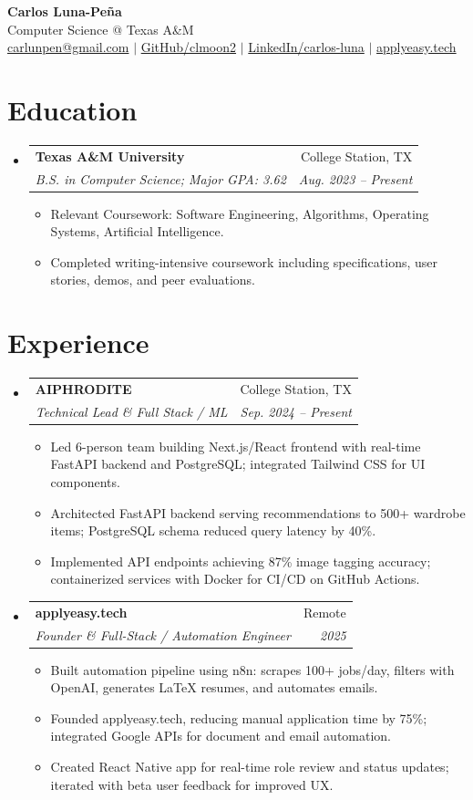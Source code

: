 \documentclass[letterpaper,11pt]{article}
\makeatletter
\newcommand{\resumeItem}[1]{%
  \item\small{{#1 \vspace{-2pt}}}
}
\newcommand{\resumeSubheading}[4]{%
  \vspace{-2pt}\item
    \begin{tabular*}{0.97\textwidth}[t]{l@{\extracolsep{\fill}}r}
      \textbf{#1} & #2 \\
      \textit{\small#3} & \textit{\small #4} \\
    \end{tabular*}\vspace{-7pt}
}
\newcommand{\resumeSubHeadingListStart}{\begin{itemize}[leftmargin=0.15in, label={}]}
\newcommand{\resumeSubHeadingListEnd}{\end{itemize}}
\newcommand{\resumeItemListStart}{\begin{itemize}}
\newcommand{\resumeItemListEnd}{\end{itemize}\vspace{-5pt}}
\makeatother
\begin{document}
\begin{center}
    \textbf{\LARGE Carlos Luna-Peña} \\ \vspace{2pt}
    \small Computer Science @ Texas A\&M \\ \vspace{1pt}
    \small \href{mailto:carlunpen@gmail.com}{carlunpen@gmail.com} $|$ 
    \href{https://github.com/clmoon2}{GitHub/clmoon2} $|$ 
    \href{https://linkedin.com/in/carlos-luna}{LinkedIn/carlos-luna} $|$ 
    \href{https://applyeasy.tech}{applyeasy.tech}
\end{center}

\section{Education}
\resumeSubHeadingListStart
\resumeSubheading
{Texas A\&M University}{College Station, TX}
{B.S. in Computer Science; Major GPA: 3.62}{Aug. 2023 -- Present}
\resumeItemListStart
\resumeItem{Relevant Coursework: Software Engineering, Algorithms, Operating Systems, Artificial Intelligence.}
\resumeItem{Completed writing-intensive coursework including specifications, user stories, demos, and peer evaluations.}
\resumeItemListEnd
\resumeSubHeadingListEnd

\section{Experience}
\resumeSubHeadingListStart

\resumeSubheading
{AIPHRODITE}{College Station, TX}
{Technical Lead \& Full Stack / ML}{Sep. 2024 -- Present}
\resumeItemListStart
\resumeItem{Led 6-person team building Next.js/React frontend with real-time FastAPI backend and PostgreSQL; integrated Tailwind CSS for UI components.}
\resumeItem{Architected FastAPI backend serving recommendations to 500+ wardrobe items; PostgreSQL schema reduced query latency by 40\%.}
\resumeItem{Implemented API endpoints achieving 87\% image tagging accuracy; containerized services with Docker for CI/CD on GitHub Actions.}
\resumeItemListEnd

\resumeSubheading
{applyeasy.tech}{Remote}
{Founder \& Full-Stack / Automation Engineer}{2025}
\resumeItemListStart
\resumeItem{Built automation pipeline using n8n: scrapes 100+ jobs/day, filters with OpenAI, generates LaTeX resumes, and automates emails.}
\resumeItem{Founded applyeasy.tech, reducing manual application time by 75\%; integrated Google APIs for document and email automation.}
\resumeItem{Created React Native app for real-time role review and status updates; iterated with beta user feedback for improved UX.}
\resumeItemListEnd
\resumeSubHeadingListEnd
\end{document}
